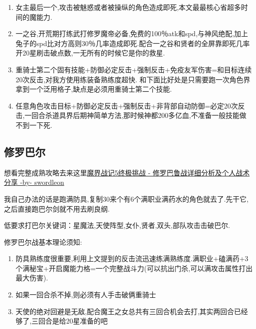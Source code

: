 	\begin{enumerate}
		\item
		女主最后一个,攻击被魅惑或者被操纵的角色造成即死,本文最最核心省超多时间的魔能力.
		\item
		一之谷,开荒期打练武打修罗魔帝必备,免费的100％atk和spd,与神风绝配,加上兔子的spd比对方高则30％几率造成即死.配合一之谷和贤者的全屏靠即死几率开20星刷击破点数,一无所有的时候它是你的救星.
		\item
		重骑士第二个固有技能+防御必定反击+强制反击+免疫友军伤害=和目标连续20次反击,对我方使用练装备熟练度超快.
		和下面比好处是只需要跑一次角色界拿到一个泛用格子,缺点是必须用重骑士第二个技能.
		\item
		任意角色攻击目标+防御必定反击+强制反击+非背部自动防御=必定20次反击,一回合杀道具界后期神简单方法,那时候神都200多亿血,不准备一般技能做不到一下死.
	\end{enumerate}


	\subsection{修罗巴尔}

	想看完整成熟攻略去来这里\href{http://tieba.baidu.com/p/3949061316}{魔界战记5终极挑战 - 修罗巴鲁战详细分析及个人战术分享 -by- swordleon }

	我自己办法的话是跑满防具,复制30来个有6个满职业满药水的角色就去了.先干它,之后直接跑巴尔剑就不用去刷良纲.

	低要求打巴尔关键词：星魔法,天使阵型,女仆,贤者,双头,部队攻击击破巴尔.



	修罗巴尔战基本理论须知:

	\begin{enumerate}
		\item 
		防具熟练度很重要,利用上文提到的反击流迅速练满熟练度.满职业+磕满药+3个满秘宝+开启魔能力格=一个完整战斗力(可以抗出门杀,可以满攻击属性打出最大伤害).

		\item
		如果一回合杀不掉,则必须有人手击破俩重骑士

		\item
		天使的绝对回避是无敌,配合魔王之女总共有三回合机会去打,其实两回合已经够了,三回合是给20星准备的吧

	\end{enumerate}
	







